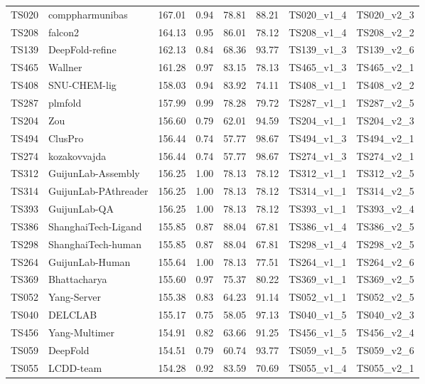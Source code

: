 \begin{longtable}{llllllll}
TS020 & comppharmunibas & 167.01 & 0.94 & 78.81 & 88.21 & TS020\_v1\_4 & TS020\_v2\_3 \\ 
TS208 & falcon2 & 164.13 & 0.95 & 86.01 & 78.12 & TS208\_v1\_4 & TS208\_v2\_2 \\ 
TS139 & DeepFold-refine & 162.13 & 0.84 & 68.36 & 93.77 & TS139\_v1\_3 & TS139\_v2\_6 \\ 
TS465 & Wallner & 161.28 & 0.97 & 83.15 & 78.13 & TS465\_v1\_3 & TS465\_v2\_1 \\ 
TS408 & SNU-CHEM-lig & 158.03 & 0.94 & 83.92 & 74.11 & TS408\_v1\_1 & TS408\_v2\_2 \\ 
TS287 & plmfold & 157.99 & 0.99 & 78.28 & 79.72 & TS287\_v1\_1 & TS287\_v2\_5 \\ 
TS204 & Zou & 156.60 & 0.79 & 62.01 & 94.59 & TS204\_v1\_1 & TS204\_v2\_3 \\ 
TS494 & ClusPro & 156.44 & 0.74 & 57.77 & 98.67 & TS494\_v1\_3 & TS494\_v2\_1 \\ 
TS274 & kozakovvajda & 156.44 & 0.74 & 57.77 & 98.67 & TS274\_v1\_3 & TS274\_v2\_1 \\ 
TS312 & GuijunLab-Assembly & 156.25 & 1.00 & 78.13 & 78.12 & TS312\_v1\_1 & TS312\_v2\_5 \\ 
TS314 & GuijunLab-PAthreader & 156.25 & 1.00 & 78.13 & 78.12 & TS314\_v1\_1 & TS314\_v2\_5 \\ 
TS393 & GuijunLab-QA & 156.25 & 1.00 & 78.13 & 78.12 & TS393\_v1\_1 & TS393\_v2\_4 \\ 
TS386 & ShanghaiTech-Ligand & 155.85 & 0.87 & 88.04 & 67.81 & TS386\_v1\_4 & TS386\_v2\_5 \\ 
TS298 & ShanghaiTech-human & 155.85 & 0.87 & 88.04 & 67.81 & TS298\_v1\_4 & TS298\_v2\_5 \\ 
TS264 & GuijunLab-Human & 155.64 & 1.00 & 78.13 & 77.51 & TS264\_v1\_1 & TS264\_v2\_6 \\ 
TS369 & Bhattacharya & 155.60 & 0.97 & 75.37 & 80.22 & TS369\_v1\_1 & TS369\_v2\_5 \\ 
TS052 & Yang-Server & 155.38 & 0.83 & 64.23 & 91.14 & TS052\_v1\_1 & TS052\_v2\_5 \\ 
TS040 & DELCLAB & 155.17 & 0.75 & 58.05 & 97.13 & TS040\_v1\_5 & TS040\_v2\_3 \\ 
TS456 & Yang-Multimer & 154.91 & 0.82 & 63.66 & 91.25 & TS456\_v1\_5 & TS456\_v2\_4 \\ 
TS059 & DeepFold & 154.51 & 0.79 & 60.74 & 93.77 & TS059\_v1\_5 & TS059\_v2\_6 \\ 
TS055 & LCDD-team & 154.28 & 0.92 & 83.59 & 70.69 & TS055\_v1\_4 & TS055\_v2\_1 \\ 

\end{longtable}
